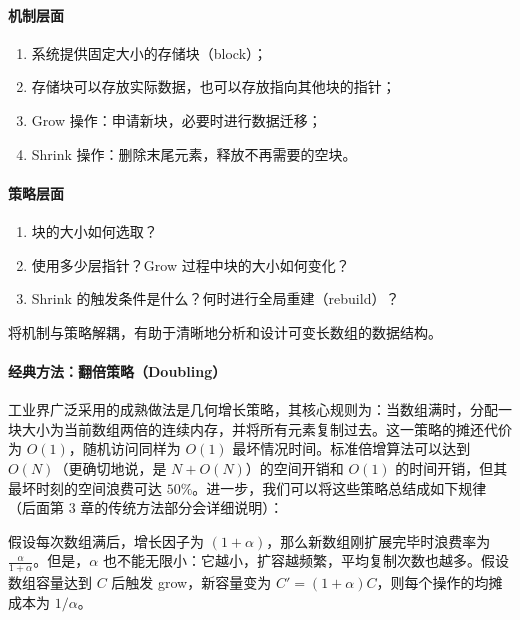 \documentclass[12pt,a4paper]{article}
\begin{document}
\paragraph{机制层面}

\begin{enumerate}
	
	\item 系统提供固定大小的存储块（block）；
	
	\item 存储块可以存放实际数据，也可以存放指向其他块的指针；
	
	\item Grow 操作：申请新块，必要时进行数据迁移；
	
	\item Shrink 操作：删除末尾元素，释放不再需要的空块。
	
\end{enumerate}

\paragraph{策略层面}

\begin{enumerate}
	
	\item 块的大小如何选取？
	
	\item 使用多少层指针？Grow 过程中块的大小如何变化？
	
	\item Shrink 的触发条件是什么？何时进行全局重建（rebuild）？
	
\end{enumerate}

将机制与策略解耦，有助于清晰地分析和设计可变长数组的数据结构。

\paragraph{经典方法：翻倍策略（Doubling）}

工业界广泛采用的成熟做法是几何增长策略，其核心规则为：当数组满时，分配一块大小为当前数组两倍的连续内存，并将所有元素复制过去。这一策略的摊还代价为 $O(1)$，随机访问同样为 $O(1)$ 最坏情况时间\cite{cormen2009introduction}。标准倍增算法可以达到 $O(N)$（更确切地说，是 $N+O(N)$）的空间开销和 $O(1)$ 的时间开销，但其最坏时刻的空间浪费可达 $50\%$。进一步，我们可以将这些策略总结成如下规律（后面第 3 章的传统方法部分会详细说明）：

假设每次数组满后，增长因子为 $(1+\alpha)$，那么新数组刚扩展完毕时浪费率为 $\frac{\alpha}{1+\alpha}$。但是，$\alpha$ 也不能无限小：它越小，扩容越频繁，平均复制次数也越多。假设数组容量达到 $C$ 后触发 grow，新容量变为 $C'=(1+\alpha)C$，则每个操作的均摊成本为 $1/\alpha$。
\end{document}
